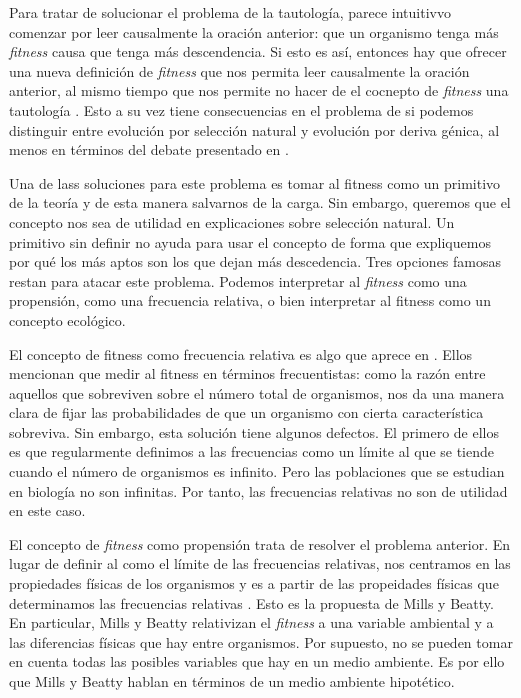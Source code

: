 Para tratar de solucionar el problema de la tautología, parece intuitivvo comenzar por leer causalmente la oración anterior: que un organismo tenga más \emph{fitness} causa que tenga más descendencia. Si esto es así, entonces hay que ofrecer una nueva definición de \emph{fitness} que nos permita leer causalmente la oración anterior, al mismo tiempo que nos permite no hacer de el cocnepto de \emph{fitness} una tautología \cite{Bouchard2004}. Esto a su vez tiene consecuencias en el problema de si podemos distinguir entre evolución por selección natural y evolución por deriva génica, al menos en términos del debate presentado en \cite{Walsh2002, Bouchard2004}.

Una de lass soluciones para este problema es tomar al fitness como un primitivo de la teoría y de esta manera salvarnos de la carga. Sin embargo, queremos que el concepto nos sea de utilidad en explicaciones sobre selección natural. Un primitivo sin definir no ayuda para usar el concepto de forma que expliquemos por qué los más aptos son los que dejan más descedencia. Tres opciones famosas restan para atacar este problema. Podemos interpretar al \emph{fitness} como una propensión, como una frecuencia relativa, o bien interpretar al fitness como un concepto ecológico.

El concepto de fitness como frecuencia relativa es algo que aprece en \cite{Walsh2002}. Ellos mencionan que medir al fitness en términos frecuentistas: como la razón entre aquellos que sobreviven sobre el número total de organismos, nos da una manera clara de fijar las probabilidades de que un organismo con cierta característica sobreviva. Sin embargo, esta solución  tiene algunos defectos. El primero de ellos es que regularmente definimos a las frecuencias como un límite al que se tiende cuando el número de organismos es infinito. Pero las poblaciones que se estudian en biología no son infinitas. Por tanto, las frecuencias relativas no son de utilidad en este caso.

El concepto de \emph{fitness} como propensión trata de resolver el problema anterior. En lugar de definir al  como el límite de las frecuencias relativas, nos centramos en las propiedades físicas de los organismos y es a partir de las propeidades físicas que determinamos las frecuencias relativas \cite{Mills1979}. Esto es la propuesta de Mills y Beatty. En particular, Mills y Beatty relativizan el \emph{fitness} a una variable ambiental y a las diferencias físicas que hay entre organismos. Por supuesto, no se pueden tomar en cuenta todas las posibles variables que hay en un medio ambiente. Es por ello que Mills y Beatty hablan en términos de un medio ambiente hipotético.

